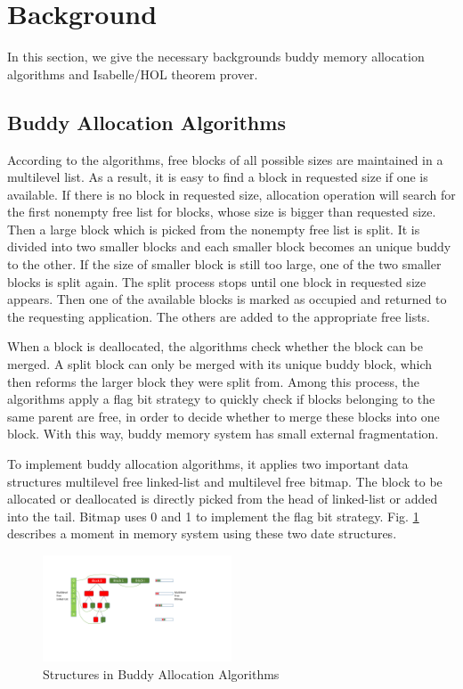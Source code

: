 \section{Background}
In this section, we give the necessary backgrounds  buddy memory allocation algorithms and Isabelle/HOL theorem prover.

\subsection{Buddy Allocation Algorithms}
According to the algorithms, free blocks of all possible sizes are maintained in a multilevel list. As a result, it is easy to find a block in requested size if one is available. If there is no block in requested size, allocation operation will search for the first nonempty free list for blocks, whose size is bigger than requested size. Then a large block which is picked from the nonempty free list is split. It is divided into two smaller blocks and each smaller block becomes an unique buddy to the other. If the size of smaller block is still too large, one of the two smaller blocks is split again. The split process stops until one block in requested size appears. Then one of the available blocks is marked as occupied and returned to the requesting application. The others are added to the appropriate free lists.

When a block is deallocated, the algorithms check whether the block can be merged. A split block can only be merged with its unique buddy block, which then reforms the larger block they were split from. Among this process, the algorithms apply a flag bit strategy to quickly check if blocks belonging to the same parent are free, in order to decide whether to merge these blocks into one block. With this way, buddy memory system has small external fragmentation.

To implement buddy allocation algorithms, it applies two important data structures multilevel free linked-list and multilevel free bitmap. The block to be allocated or deallocated is directly picked from the head of linked-list or added into the tail. Bitmap uses 0 and 1 to implement the flag bit strategy. Fig. \ref{fig3} describes a moment in memory system using these two date structures.

\begin{figure}[htbp]
	\centering
	\includegraphics[width=0.5\textwidth]{fig3.pdf}
	\caption{Structures in Buddy Allocation Algorithms}
	\label{fig3}
\end{figure}

